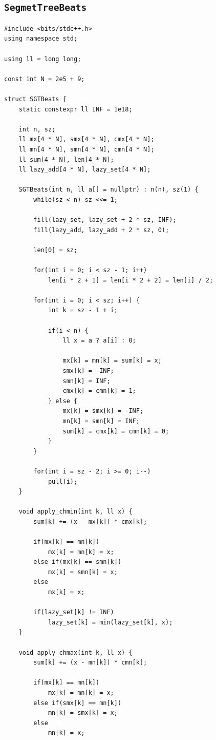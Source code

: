 \subsection{\texttt{SegmetTreeBeats}}
\begin{lstlisting}
#include <bits/stdc++.h>
using namespace std;

using ll = long long;

const int N = 2e5 + 9;

struct SGTBeats {
    static constexpr ll INF = 1e18;

    int n, sz;
    ll mx[4 * N], smx[4 * N], cmx[4 * N];
    ll mn[4 * N], smn[4 * N], cmn[4 * N];
    ll sum[4 * N], len[4 * N];
    ll lazy_add[4 * N], lazy_set[4 * N];

    SGTBeats(int n, ll a[] = nullptr) : n(n), sz(1) {
        while(sz < n) sz <<= 1;

        fill(lazy_set, lazy_set + 2 * sz, INF);
        fill(lazy_add, lazy_add + 2 * sz, 0);

        len[0] = sz;

        for(int i = 0; i < sz - 1; i++)
            len[i * 2 + 1] = len[i * 2 + 2] = len[i] / 2;

        for(int i = 0; i < sz; i++) {
            int k = sz - 1 + i;

            if(i < n) {
                ll x = a ? a[i] : 0;

                mx[k] = mn[k] = sum[k] = x;
                smx[k] = -INF;
                smn[k] = INF;
                cmx[k] = cmn[k] = 1;
            } else {
                mx[k] = smx[k] = -INF;
                mn[k] = smn[k] = INF;
                sum[k] = cmx[k] = cmn[k] = 0;
            }
        }

        for(int i = sz - 2; i >= 0; i--)
            pull(i);
    }

    void apply_chmin(int k, ll x) {
        sum[k] += (x - mx[k]) * cmx[k];

        if(mx[k] == mn[k])
            mx[k] = mn[k] = x;
        else if(mx[k] == smn[k])
            mx[k] = smn[k] = x;
        else
            mx[k] = x;

        if(lazy_set[k] != INF)
            lazy_set[k] = min(lazy_set[k], x);
    }

    void apply_chmax(int k, ll x) {
        sum[k] += (x - mn[k]) * cmn[k];

        if(mx[k] == mn[k])
            mx[k] = mn[k] = x;
        else if(smx[k] == mn[k])
            mn[k] = smx[k] = x;
        else
            mn[k] = x;


\end{lstlisting}
